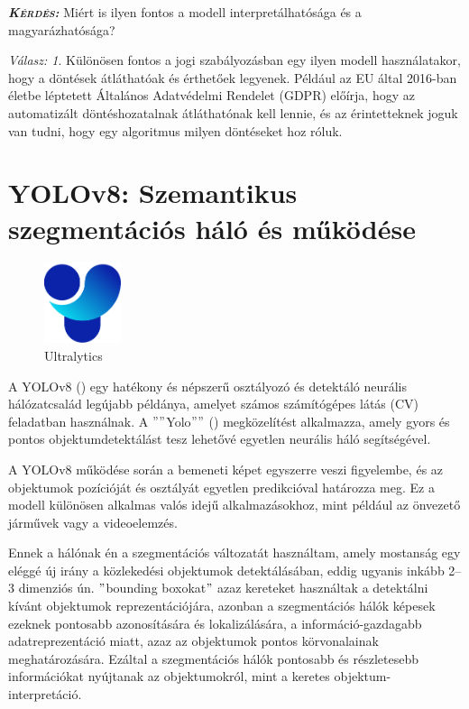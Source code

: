 \documentclass[12pt,oneside,a4paper]{article}
\newcommand{\newsection}[1]{\clearpage\section{#1}}\label{makro}
\theoremstyle{remark}
\newtheorem*{remarkth}{Válasz: \newline}
\newenvironment{remark}{\begin{remarkth}}{\end{remarkth}}
\newenvironment{kerdes}{
    \medskip%
    \par\noindent\ignorespaces%
    \textit{\textsc{\textbf{Kérdés: }}}%
    \medskip
    \textsf%
}{%
\medskip
}
\begin{document}
\begin{kerdes}
    Miért is ilyen fontos a modell interpretálhatósága és a magyarázhatósága?
\end{kerdes}
\begin{remark}
    Különösen fontos a jogi szabályozásban egy ilyen modell használatakor, hogy a döntések átláthatóak és
    érthetőek legyenek.
    Például az \ac{EU} által 2016-ban életbe léptetett Általános Adatvédelmi Rendelet (\ac{GDPR}) előírja, hogy az
    automatizált döntéshozatalnak átláthatónak kell lennie, és az érintetteknek joguk van tudni, hogy egy algoritmus
    milyen döntéseket hoz róluk.
\end{remark}
\newsection{YOLOv8: Szemantikus szegmentációs háló és működése}\label{sec:yolov8:-szemantikus-szegmentacios-halo}
    \begin{figure}
        \centering
        \includegraphics[width=0.2\textwidth]{Ultralytics}
        \caption{Ultralytics}
        \label{fig:Ultralytics}
    \end{figure}
    A YOLOv8 (\cite{Yolov8})\label{irodalomhivatkozas} egy hatékony és népszerű osztályozó és detektáló neurális hálózatcsalád legújabb példánya,
    amelyet számos számítógépes látás (\ac{CV})
    feladatban használnak.
    A \(""\)\gls{Yolo}\(""\) () megközelítést alkalmazza,
    amely gyors és pontos objektumdetektálást tesz lehetővé egyetlen neurális háló segítségével.


    A YOLOv8 működése során a bemeneti képet egyszerre veszi figyelembe, és az objektumok pozícióját
és osztályát egyetlen predikcióval határozza meg.
Ez a modell különösen alkalmas valós
idejű alkalmazásokhoz, mint például az önvezető járművek vagy a videoelemzés.

Ennek a hálónak én a szegmentációs változatát használtam, amely mostanság egy eléggé új
irány a közlekedési objektumok detektálásában, eddig ugyanis inkább 2--3 dimenziós ún. \("\)bounding boxokat\("\)
azaz kereteket használtak a detektálni kívánt objektumok reprezentációjára, azonban a szegmentációs hálók képesek ezeknek pontosabb azonosítására és lokalizálására, a információ-gazdagabb  adatreprezentáció miatt, azaz az objektumok pontos körvonalainak meghatározására.
Ezáltal a szegmentációs hálók pontosabb és részletesebb információkat nyújtanak az objektumokról, mint a keretes objektum-interpretáció.
\end{document}

